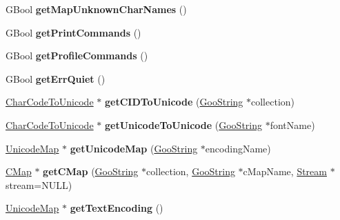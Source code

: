 \begin{DoxyCompactItemize}
G\+Bool {\bfseries get\+Map\+Unknown\+Char\+Names} ()
\item 
\mbox{\label{class_global_params_a520222ffc2b8ffe4b90b19d738b5ac1a}} 
G\+Bool {\bfseries get\+Print\+Commands} ()
\item 
\mbox{\label{class_global_params_a205266c03a18450971d78158b4ef528e}} 
G\+Bool {\bfseries get\+Profile\+Commands} ()
\item 
\mbox{\label{class_global_params_a70e439d982639ad5e7a8f80c97a8759d}} 
G\+Bool {\bfseries get\+Err\+Quiet} ()
\item 
\mbox{\label{class_global_params_a96d6053820a2496de3b1cfc46f44cca6}} 
\hyperlink{class_char_code_to_unicode}{Char\+Code\+To\+Unicode} $\ast$ {\bfseries get\+C\+I\+D\+To\+Unicode} (\hyperlink{class_goo_string}{Goo\+String} $\ast$collection)
\item 
\mbox{\label{class_global_params_a74dd083612f5943bbeddc13da0d84e47}} 
\hyperlink{class_char_code_to_unicode}{Char\+Code\+To\+Unicode} $\ast$ {\bfseries get\+Unicode\+To\+Unicode} (\hyperlink{class_goo_string}{Goo\+String} $\ast$font\+Name)
\item 
\mbox{\label{class_global_params_a4f6cab3f0035e225231386a5fe7d2b5d}} 
\hyperlink{class_unicode_map}{Unicode\+Map} $\ast$ {\bfseries get\+Unicode\+Map} (\hyperlink{class_goo_string}{Goo\+String} $\ast$encoding\+Name)
\item 
\mbox{\label{class_global_params_a5d7676c6bbe4937b860b3eaceb615674}} 
\hyperlink{class_c_map}{C\+Map} $\ast$ {\bfseries get\+C\+Map} (\hyperlink{class_goo_string}{Goo\+String} $\ast$collection, \hyperlink{class_goo_string}{Goo\+String} $\ast$c\+Map\+Name, \hyperlink{class_stream}{Stream} $\ast$stream=N\+U\+LL)
\item 
\mbox{\label{class_global_params_a69d4badd1d304b6074de5825ca51856b}} 
\hyperlink{class_unicode_map}{Unicode\+Map} $\ast$ {\bfseries get\+Text\+Encoding} ()
\item 
\mbox{\label{class_global_params_a2074c811f82c6be67536f2e214479fe3}} 

\end{DoxyCompactItemize}
